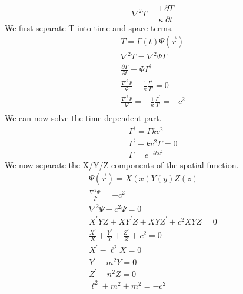 \documentclass[a4paper,10pt]{article}
\numberwithin{equation}{section}
\begin{document}
\begin{equation}
 \nabla^2T=\frac{1}{\kappa}\frac{\partial T}{\partial t}
\end{equation}
We first separate T into time and space terms.
\begin{gather}
 T=\Gamma (t)\Psi(\vec{r})\\
 \nabla ^2T=\nabla ^2 \Psi \Gamma\\
 \frac{\partial T}{\partial t}=\Psi \Gamma ^{\prime}\\
 \frac{\nabla ^2 \Psi}{\Psi}-\frac{1}{\kappa}\frac{\Gamma ^{\prime}}{\Gamma}=0\\
 \frac{\nabla ^2 \Psi}{\Psi}=-\frac{1}{\kappa}\frac{\Gamma ^{\prime}}{\Gamma}=-c^2\\
\end{gather}
We can now solve the time dependent part.
\begin{gather}
\Gamma ^{\prime}=\Gamma kc^2\\
\Gamma ^{\prime}-kc^2\Gamma=0\\
\Gamma=e^{-tkc^2}
\end{gather}
We now separate the X/Y/Z components of the spatial function.
\begin{gather}
\Psi (\vec{r})=X(x)Y(y)Z(z)\\
\frac{\nabla ^2\Psi}{\Psi}=-c^2\\
\nabla ^2\Psi +c^2 \Psi =0\\
X^\prime YZ+XY^\prime Z+XYZ^\prime +c^2XYZ=0\\
\frac{X^\prime }{X}+\frac{Y^\prime }{Y}+\frac{Z^\prime }{Z}+c^2=0\\
X^\prime -\ell^2 X=0\\
Y^\prime -m^2 Y=0\\
Z^\prime -n^2 Z=0\\
\ell ^2+m^2+m^2=-c^2
\end{gather}
\end{document}
